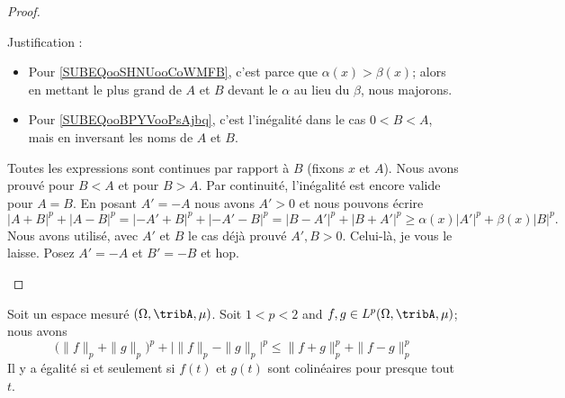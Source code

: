 \begin{proof}
\begin{subproof}
\begin{subequations}
        \end{subequations}
        Justification :
        \begin{itemize}
            \item Pour \eqref{SUBEQooSHNUooCoWMFB}, c'est parce que \( \alpha(x)>\beta(x)\); alors en mettant le plus grand de \( A\) et \( B\) devant le \( \alpha\) au lieu du \( \beta\), nous majorons.
            \item Pour \eqref{SUBEQooBPYVooPsAjbq}, c'est l'inégalité dans le cas \( 0<B<A\), mais en inversant les noms de \( A\) et \( B\).
        \end{itemize}
        \spitem[Pour \( 0<A=B\)]
        Toutes les expressions sont continues par rapport à \( B\) (fixons \( x\) et \( A\)). Nous avons prouvé pour \( B<A\) et pour \( B>A\). Par continuité, l'inégalité est encore valide pour \( A=B\).
        \spitem[Pour \( A<0\), \( B>0\)]
        En posant \( A'=-A\) nous avons \( A'>0\) et nous pouvons écrire
        \begin{equation}
            | A+B |^p+| A-B |^p=| -A'+B |^p+| -A'-B |^p=| B-A' |^p+| B+A' |^p\geq \alpha(x)| A' |^p+\beta(x)| B |^p.
        \end{equation}
        Nous avons utilisé, avec \( A'\) et \( B\) le cas déjà prouvé \( A',B>0\).
        \spitem[Pour \( A>0\), \( B<0\)]
        Celui-là, je vous le laisse.
        \spitem[Pour \( A<0\), \( B<0\)]
        Posez \( A'=-A\) et \( B'=-B\) et hop.
    \end{subproof}
\end{proof}


\begin{theorem}       \label{THOooZRRYooBTBQKW}
    Soit un espace mesuré \(  (\Omega,\tribA,\mu)\). Soit \( 1<p<2\) and \( f,g\in L^p(\Omega,\tribA,\mu)\); nous avons
    \begin{equation}
        \big( \| f \|_p+\| g \|_p \big)^p+\Big| \| f \|_p-\| g \|_p \Big|^p
        \leq \| f+g \|_p^p+\| f-g \|_p^p
    \end{equation}
    Il y a égalité si et seulement si \( f(t) \) et \( g(t)\) sont colinéaires pour presque tout \( t\).
\end{theorem}


